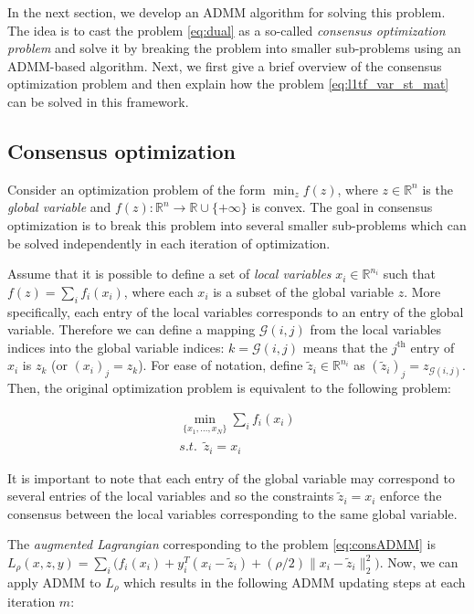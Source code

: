 \documentclass[review]{elsarticle}
\begin{document}
In the next section, we develop an ADMM algorithm for solving this problem. The idea is to cast the problem \ref{eq:dual} as a so-called \textit{consensus optimization problem} \cite{boyd_distributed_2011} and solve it by breaking the problem into smaller sub-problems using an ADMM-based algorithm. Next, we first give a brief overview of the consensus optimization problem and then explain how the problem \ref{eq:l1tf_var_st_mat} can be solved in this framework.

\subsection{Consensus optimization}
\label{sec:consOpt}

Consider an optimization problem of the form $\min_z f(z)$, where $z\in\mathbb{R}^n$ is the \textit{global variable} and $f(z):\mathbb{R}^n \rightarrow \mathbb{R}\cup \{+\infty\}$ is convex. The goal in consensus optimization is to break this problem into several smaller sub-problems which can be solved independently in each iteration of optimization. 

Assume that it is possible to define a set of \textit{local variables} $x_i \in \mathbb{R}^{n_i}$ such that $f(z)=\sum_i f_i(x_i)$, where each $x_i$ is a subset of the global variable $z$. More specifically, each entry of the local variables corresponds to an entry of the global variable. Therefore we can define a mapping $\mathscr{G}(i,j)$ from the local variables indices into the global variable indices: $k=\mathscr{G}(i,j)$ means that the $j^\text{th}$ entry of $x_i$ is $z_k$ (or $(x_i)_j=z_k$). For ease of notation, define $\tilde{z}_i \in \mathbb{R}^{n_i}$ as $(\tilde{z}_i)_j=z_{\mathscr{G}(i,j)}$. Then, the original optimization problem is equivalent to the following problem: 

\begin{equation}
\begin{aligned}
\min_{\{x_1,...,x_N  \}} \sum_i f_i(x_i)\\
 s.t. \,\,\, \tilde{z}_i=x_i \,\,\,\,\,\,
\end{aligned}
\label{eq:consADMM}
\end{equation}

It is important to note that each entry of the global variable may correspond to several entries of the local variables and so the constraints $\tilde{z}_i=x_i$ enforce the consensus between the local variables corresponding to the same global variable. 

The \textit{augmented Lagrangian} corresponding to the problem \ref{eq:consADMM} is $L_\rho(x,z,y)=\sum_i \big(f_i(x_i)+y_i^T(x_i-\tilde{z}_i) + (\rho/2) \lVert x_i-\tilde{z}_i \lVert_2^2 \big)$. Now, we can apply ADMM to $L_\rho$ which results in the following ADMM updating steps at each iteration $m$:
\end{document}

